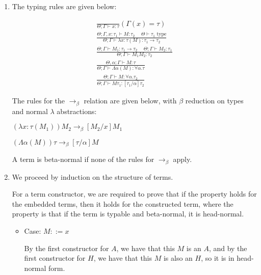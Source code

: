 \documentclass[12pt]{article}
\begin{document}
\begin{enumerate}[label=(\alph*)]
  \item
    The typing rules are given below:

    \begingroup
    \addtolength{\jot}{1em}
    \begin{align*}
      \frac{}{\Theta;\Gamma \vdash x : \tau} (\Gamma(x) = \tau)\\
      \frac{\Theta;\Gamma, x : \tau_1 \vdash M : \tau_2 \hspace{15pt} \Theta \vdash \tau_1 \text{ type}}{\Theta;\Gamma \vdash \lambda x:\tau(M) : \tau_1 \rightarrow \tau_2}\\
      \frac{\Theta; \Gamma \vdash M_1 : \tau_1 \rightarrow \tau_2 \hspace{15pt} \Theta;\Gamma \vdash M_2 : \tau_1}{\Theta; \Gamma \vdash M_1 M_2 : \tau_2}\\
      \frac{\Theta,\alpha;\Gamma \vdash M : \tau}{\Theta;\Gamma \vdash \Lambda \alpha(M) : \forall \alpha. \tau}\\
      \frac{\Theta;\Gamma \vdash M : \forall \alpha. \tau_2}{\Theta;\Gamma \vdash M \tau_1 : [\tau_1 / \alpha]\tau_2}
    \end{align*}
    \endgroup

    The rules for the $\rightarrow_\beta$ relation are given below, with $\beta$ reduction on types and normal $\lambda$ abstractions:

    $(\lambda x : \tau(M_1)) M_2 \rightarrow_\beta [M_2 / x]M_1$

    $(\Lambda \alpha(M)) \tau \rightarrow_\beta [\tau / \alpha] M$

    A term is beta-normal if none of the rules for $\rightarrow_\beta$ apply.

  \item
    We proceed by induction on the structure of terms.

    For a term constructor, we are required to prove that if the property holds for the embedded terms, then it holds for the constructed term, where the property is that if the term is typable and beta-normal, it is head-normal.

    \begin{itemize}
      \item
        Case: $M ::= x$

        By the first constructor for $A$, we have that this $M$ is an $A$, and by the first constructor for $H$, we have that this $M$ is also an $H$, so it is in head-normal form.


\end{itemize}
\end{enumerate}
\end{document}
